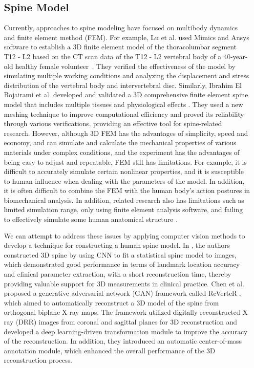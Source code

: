 \subsection{Spine Model}
Currently, approaches to spine modeling have focused on multibody dynamics and finite element method (FEM). For example, Lu et al. used Mimics and Ansys software to establish a 3D finite element model of the thoracolumbar segment T12 - L2 based on the CT scan data of the T12 - L2 vertebral body of a 40-year-old healthy female volunteer~\cite{lu2022establishment}. They verified the effectiveness of the model by simulating multiple working conditions and analyzing the displacement and stress distribution of the vertebral body and intervertebral disc. Similarly, Ibrahim El Bojairami et al. developed and validated a 3D comprehensive finite element spine model that includes multiple tissues and physiological effects \cite{el2020development}. They used a new meshing technique to improve computational efficiency and proved its reliability through various verifications, providing an effective tool for spine-related research. However, although 3D FEM has the advantages of simplicity, speed and economy, and can simulate and calculate the mechanical properties of various materials under complex conditions, and the experiment has the advantages of being easy to adjust and repeatable, FEM still has limitations. For example, it is difficult to accurately simulate certain nonlinear properties, and it is susceptible to human influence when dealing with the parameters of the model. In addition, it is often difficult to combine the FEM with the human body's action postures in biomechanical analysis. In addition, related research also has limitations such as limited simulation range, only using finite element analysis software, and failing to effectively simulate some human anatomical structure \cite{naoum2021finite}.
\par We can attempt to address these issues by applying computer vision methods to develop a technique for constructing a human spine model. In \cite{aubert2019toward}, the authors constructed 3D spine by using CNN to fit a statistical spine model to images, which demonstrated good performance in terms of landmark location accuracy and clinical parameter extraction, with a short reconstruction time, thereby providing valuable support for 3D measurements in clinical practice. Chen et al. proposed a generative adversarial network (GAN) framework called ReVerteR \cite{chen2024automatic}, which aimed to automatically reconstruct a 3D model of the spine from orthogonal biplane X-ray maps. The framework utilized digitally reconstructed X-ray (DRR) images from coronal and sagittal planes for 3D reconstruction and developed a deep learning-driven transformation module to improve the accuracy of the reconstruction. In addition, they introduced an automatic center-of-mass annotation module, which enhanced the overall performance of the 3D reconstruction process.
